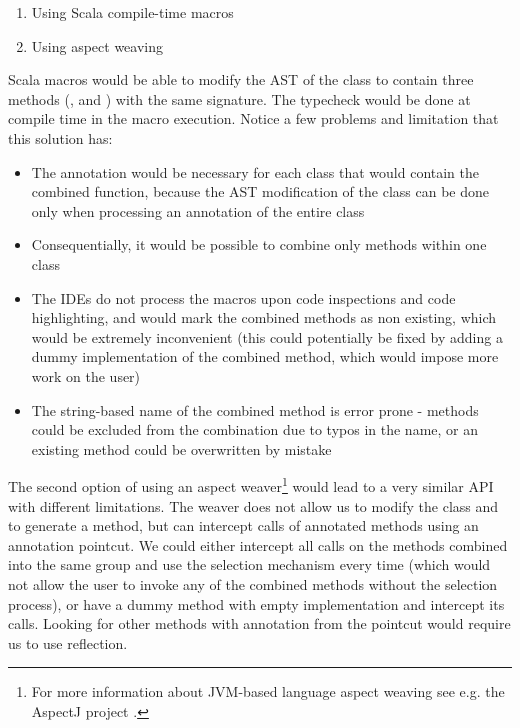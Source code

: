\begin{enumerate}
	\item Using Scala compile-time macros
	\item Using aspect weaving
\end{enumerate}

Scala macros would be able to modify the AST of the  class to contain three methods (,  and ) with the same signature. The typecheck would be done at compile time in the macro execution. Notice a few problems and limitation that this solution has:

\begin{itemize}
	\item The  annotation would be necessary for each class that would contain the combined function, because the AST modification of the class can be done only when processing an annotation of the entire class
	\item Consequentially, it would be possible to combine only methods within one class
	\item The IDEs do not process the macros upon code inspections and code highlighting, and would mark the combined methods as non existing, which would be extremely inconvenient (this could potentially be fixed by adding a dummy implementation of the combined method, which would impose more work on the user)
	\item The string-based name of the combined method is error prone - methods could be excluded from the combination due to typos in the name, or an existing method could be overwritten by mistake
\end{itemize}

The second option of using an aspect weaver\footnote{For more information about JVM-based language aspect weaving see e.g. the AspectJ project \cite{here_aspectj_nodate}.} would lead to a very similar API with different limitations. The weaver does not allow us to modify the class and to generate a method, but can intercept calls of annotated methods using an annotation pointcut. We could either intercept all calls on the methods combined into the same group and use the selection mechanism every time (which would not allow the user to invoke any of the combined methods without the selection process), or have a dummy method with empty implementation and intercept its calls. Looking for other methods with annotation from the pointcut would require us to use reflection.

